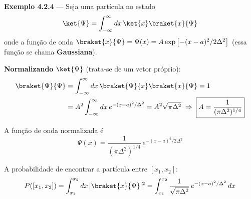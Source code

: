 \textbf{Exemplo 4.2.4} --- Seja uma partícula no estado
\begin{equation}
    \ket{\Psi} = \int_{-\infty}^{\infty} dx \, \ket{x}\braket{x}{\Psi}
\label{eq:aula12_estado_continuo}
\end{equation}
onde a função de onda $\braket{x}{\Psi} = \Psi(x) = A \exp\left[-(x-a)^2/2\Delta^2\right]$ (essa função se chama \textbf{Gaussiana}).

\begin{center}
\end{center}

\noindent\textbf{Normalizando} $\ket{\Psi}$ (trata-se de um vetor próprio):
\begin{align}
    \braket{\Psi}{\Psi} &= \int_{-\infty}^{\infty} dx \, \braket{\Psi}{x}\braket{x}{\Psi} = 1 \notag \\
    &= A^2 \int_{-\infty}^{\infty} dx\, e^{-(x-a)^2/\Delta^2} = A^2\sqrt{\pi\Delta^2} \;\Rightarrow\; \boxed{A = \frac{1}{(\pi\Delta^2)^{1/4}}}
\label{eq:aula12_normalizacao_gaussiana}
\end{align}


A função de onda normalizada é
\begin{equation}
    \Psi(x) = \frac{1}{(\pi\Delta^2)^{1/4}}\, e^{-(x-a)^2/2\Delta^2}
\label{eq:aula12_psi_normalizada}
\end{equation}

A probabilidade de encontrar a partícula entre $[x_1,x_2]$:
\begin{equation}
    P([x_1,x_2]) = \int_{x_1}^{x_2} dx \, |\braket{x}{\Psi}|^2 = \int_{x_1}^{x_2} \frac{1}{\sqrt{\pi\Delta^2}}\, e^{-(x-a)^2/\Delta^2}\, dx
\label{eq:aula12_probabilidade_intervalo}
\end{equation}

